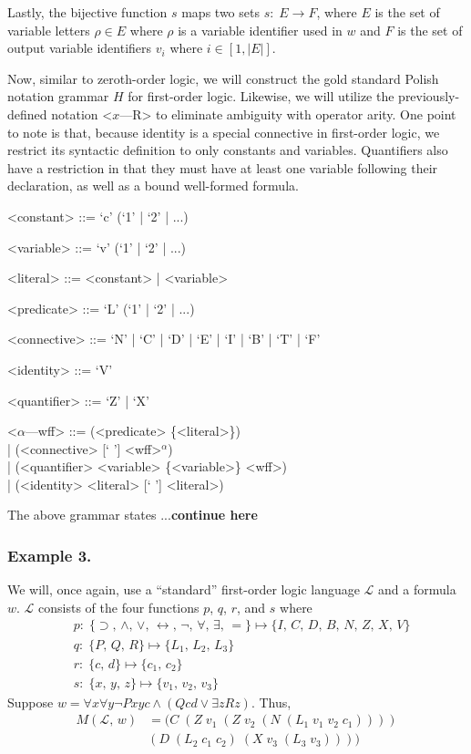 \documentclass[ms]{uncgdissertationexp2}
\theoremstyle{plain}
\theoremstyle{definition}
\theoremstyle{remark}
\begin{document}
Lastly, the bijective function $s$ maps two sets $s:\;E \to F$, where $E$ is the set of variable letters $\rho \in E$ where $\rho$ is a variable identifier used in $w$ and $F$ is the set of output variable identifiers $v_{i}$ where $i \in [1, |E|]$.

Now, similar to zeroth-order logic, we will construct the gold standard Polish notation grammar $H$ for first-order logic. Likewise, we will utilize the previously-defined notation \textless{$x$---R\textgreater} to eliminate ambiguity with operator arity. One point to note is that, because identity is a special connective in first-order logic, we restrict its syntactic definition to only constants and variables. Quantifiers also have a restriction in that they must have at least one variable following their declaration, as well as a bound well-formed formula.
\begin{grammar}

    <constant> ::= `c' (`1' | `2' | ...)

    <variable> ::= `v' (`1' | `2' | ...)

    <literal> ::= <constant> | <variable>

    <predicate> ::= `L' (`1' | `2' | ...)

    <connective> ::= `N' | `C' | `D' | `E' | `I' | `B' | `T' | `F'

    <identity> ::= `V'

    <quantifier> ::= `Z' | `X'

    <$\alpha$---wff> ::= (<predicate> \{<literal>\}) \\| (<connective> [` '] <wff>$^{\alpha}$) \\| (<quantifier> <variable> \{<variable>\} <wff>)\\| (<identity> <literal> [` '] <literal>)
\end{grammar}
The above grammar states ...\textbf{continue here}
\subsubsection{Example 3.} We will, once again, use a ``standard'' first-order logic language $\mathcal{L}$ and a formula $w$. $\mathcal{L}$ consists of the four functions $p$, $q$, $r$, and $s$ where
\begin{align*}
    &p:\;\{\supset,\,\land,\,\lor,\,\leftrightarrow,\,\lnot,\,\forall,\,\exists,\,=\}\mapsto \{I,\,C,\,D,\,B,\,N,\,Z,\,X,\,V\}\\
    &q:\;\{P,\,Q,\,R\} \mapsto \{L_{1},\,L_{2},\,L_{3}\}\\
    &r:\;\{c,\,d\} \mapsto \{c_1,\,c_2\}\\
    &s:\;\{x,\,y,\,z\} \mapsto \{v_1,\,v_2,\,v_3\}
\end{align*}
Suppose $w = \forall{x}\forall{y}\lnot{Pxyc} \land (Qcd \lor \exists{z}Rz)$. Thus,
\begin{align*}
    M(\mathcal{L},\,w) &= (C\;(Z\;v_1\;(Z\;v_2\;(N\;(L_1\;v_1\;v_2\;c_1))))\\
    &(D\;(L_2\;c_1\;c_2)\;(X\;v_3\;(L_3\;v_3))))\\
\end{align*}
\end{document}
